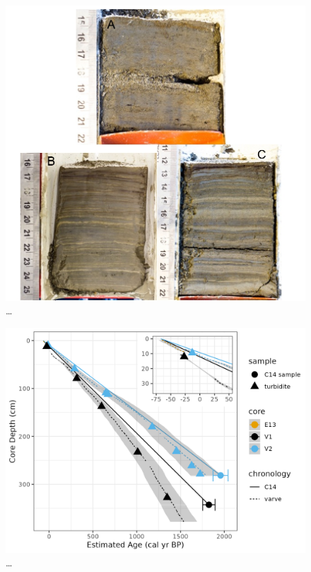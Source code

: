 \documentclass[
  letterpaper,
  DIV=11,
  numbers=noendperiod]{scrartcl}
\begin{document}
\begin{figure}

{\centering \includegraphics[width=1\textwidth,height=\textheight]{figs/ekman_example.jpg}

}

\caption{\label{fig-ekmanImgs}\ldots{}}

\end{figure}

\begin{figure}

{\centering \includegraphics[width=1\textwidth,height=\textheight]{figs/longcore_cumulative_depth_vs_estimated_year_w_ams_and_varve.png}

}

\caption{\label{fig-amsRates}\ldots{}}

\end{figure}
\end{document}
